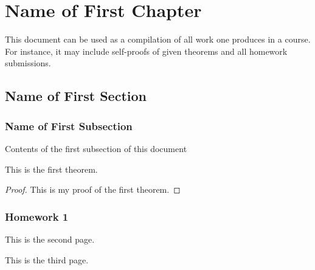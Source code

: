 \documentclass[11pt, a4paper]{book}
\begin{document}
%

%
\tableofcontents
\thispagestyle{empty}
\newpage
\setcounter{page}{1}
%
\chapter{Name of First Chapter}
This document can be used as a compilation of all work one produces in a course. For instance, it may include self-proofs of given theorems and all homework submissions. 
\section{Name of First Section}
\subsection{Name of First Subsection}
Contents of the first subsection of this document
\begin{theorem}
    This is the first theorem.
\end{theorem}
\begin{proof}
    This is my proof of the first theorem.
\end{proof}

\subsection{Homework 1}
\newpage
This is the second page.

\newpage
This is the third page.
\end{document}

